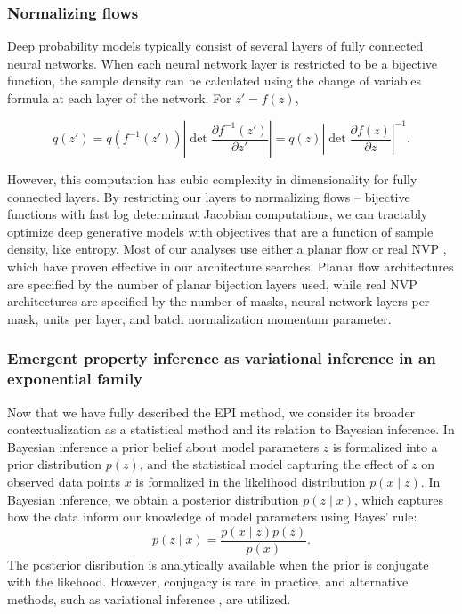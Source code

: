 \documentclass[11pt]{article}
\begin{document}
\subsubsection{Normalizing flows}\label{methods_NF}
Deep probability models typically consist of several layers of fully connected neural networks.  When each neural network layer is restricted to be a bijective function, the sample density can be calculated using the change of variables formula at each layer of the network.  For $z' = f(z)$,

\begin{equation}
q(z') = q(f^{-1}(z')) \left| \det \frac{\partial f^{-1}(z')}{\partial z'} \right| = q(z) \left| \det \frac{\partial f(z)}{\partial z} \right|^{-1}.
\end{equation}

However, this computation has cubic complexity in dimensionality for fully connected layers.  By restricting our layers to normalizing flows \cite{rezende2015variational} -- bijective functions with fast log determinant Jacobian computations, we can tractably optimize deep generative models with objectives that are a function of sample density, like entropy. Most of our analyses use either a planar flow \cite{rezende2015variational} or real NVP \cite{dinh2017density}, which have proven effective in our architecture searches.  Planar flow architectures are specified by the number of planar bijection layers used, while real NVP architectures are specified by the number of masks, neural network layers per mask, units per layer, and batch normalization momentum parameter.


\subsubsection{Emergent property inference as variational inference in an exponential family}\label{methods_VI}
Now that we have fully described the EPI method, we  consider its broader contextualization as a statistical method and its relation to Bayesian inference. 
In Bayesian inference a prior belief about model parameters $z$ is formalized into a prior distribution $p(z)$, and the statistical model capturing the effect of $z$ on observed data points $x$ is formalized in the likelihood distribution $p(x \mid z)$.
In Bayesian inference, we obtain a posterior distribution $p(z \mid x)$, which captures how the data inform our knowledge of model parameters using Bayes' rule:
\begin{equation}
p(z \mid x) = \frac{p(x \mid z) p(z)}{p(x)}.
\end{equation}
The posterior disribution is analytically available when the prior is conjugate with the likehood.
However, conjugacy is rare in practice, and alternative methods, such as variational inference \cite{blei2017variational}, are utilized.
\end{document}
